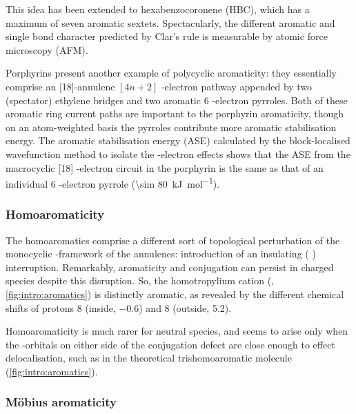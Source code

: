 			This idea has been extended to hexabenzocoronene (HBC), which has a maximum of seven aromatic sextets. Spectacularly, the different aromatic and single bond character predicted by Clar's rule is measurable by atomic force microscopy (AFM).\autocite{Gross2012}

			Porphyrins present another example of polycyclic aromaticity: they essentially comprise an [18]-annulene $[4n+2]$ \pii{}-electron pathway appended by two (spectator) ethylene bridges and two aromatic 6 \pii{}-electron pyrroles. Both of these aromatic ring current paths are important to the porphyrin aromaticity, though on an atom-weighted basis the pyrroles contribute more aromatic stabilisation energy.\autocite{Wu2013} %
			The aromatic stabilisation energy (ASE) calculated by the block-localised wavefunction method to isolate the \pii{}-electron effects shows that the ASE from the macrocyclic [18] \pii{}-electron circuit in the porphyrin is the same as that of an individual 6 \pii{}-electron pyrrole (\SI{\sim 80}{\kilo\joule\per\mole}).\autocite{Wu2013}

		\subsubsection{Homoaromaticity}

			The homoaromatics comprise a different sort of topological perturbation of the monocyclic \pii{}-framework of the annulenes: introduction of an insulating ( ) interruption. Remarkably, aromaticity and conjugation can persist in charged species despite this disruption. So, the homotropylium cation  (, \autoref{fig:intro:aromatics}) is distinctly aromatic, as revealed by the different chemical shifts of protons 8 (inside, \SI{-0.6}{\ppm}) and 8\textprime{} (outside, \SI{5.2}{\ppm}).\autocite{Rosenberg1962,Gleiter2012}

			Homoaromaticity is much rarer for neutral species,\autocite{Gleiter2012} and seems to arise only when the \pii{}-orbitals on either side of the conjugation defect are close enough to effect delocalisation, such as in the theoretical trishomoaromatic molecule  (\autoref{fig:intro:aromatics}).\autocite{Stahl2002}

		\subsubsection{M\"obius aromaticity}

